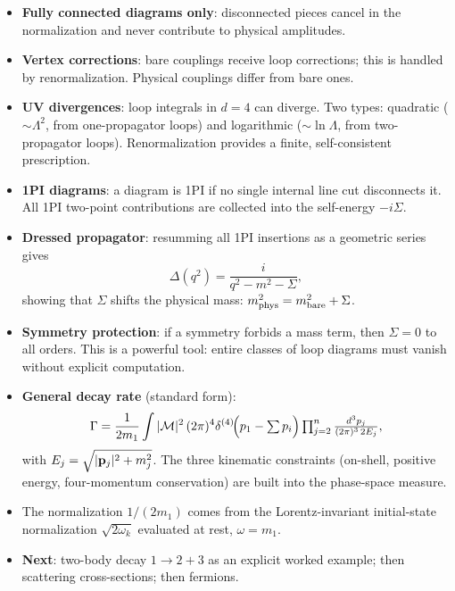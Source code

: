 \documentclass[../main.tex]{subfiles}
\begin{document}
\begin{itemize}
  \item \textbf{Fully connected diagrams only}: disconnected pieces cancel in the normalization and never contribute to physical amplitudes.

  \item \textbf{Vertex corrections}: bare couplings receive loop corrections; this is handled by renormalization.  Physical couplings differ from bare ones.

  \item \textbf{UV divergences}: loop integrals in $d=4$ can diverge.  Two types: quadratic ($\sim\Lambda^2$, from one-propagator loops) and logarithmic ($\sim\ln\Lambda$, from two-propagator loops).  Renormalization provides a finite, self-consistent prescription.

  \item \textbf{1PI diagrams}: a diagram is 1PI if no single internal line cut disconnects it.  All 1PI two-point contributions are collected into the self-energy $-i\Sigma$.

  \item \textbf{Dressed propagator}: resumming all 1PI insertions as a geometric series gives
  \[
    \Delta(q^2) = \frac{i}{q^2 - m^2 - \Sigma},
  \]
  showing that $\Sigma$ shifts the physical mass: $m_{\rm phys}^2 = m_{\rm bare}^2 + \Sigma$.

  \item \textbf{Symmetry protection}: if a symmetry forbids a mass term, then $\Sigma = 0$ to all orders. This is a powerful tool: entire classes of loop diagrams must vanish without explicit computation.

  \item \textbf{General decay rate} (standard form):
  \[
    \Gamma = \frac{1}{2m_1}\int |\mathcal{M}|^2 \,(2\pi)^4\delta^{(4)}\!\Bigl(p_1 - \textstyle\sum p_i\Bigr)
    \prod_{j=2}^n \frac{d^3p_j}{(2\pi)^3\,2E_j},
  \]
  with $E_j = \sqrt{|\mathbf{p}_j|^2 + m_j^2}$.  The three kinematic constraints (on-shell, positive energy, four-momentum conservation) are built into the phase-space measure.

  \item The normalization $1/(2m_1)$ comes from the Lorentz-invariant initial-state normalization $\sqrt{2\omega_k}$ evaluated at rest, $\omega = m_1$.

  \item \textbf{Next}: two-body decay $1 \to 2 + 3$ as an explicit worked example; then scattering cross-sections; then fermions.
\end{itemize}
\end{document}
